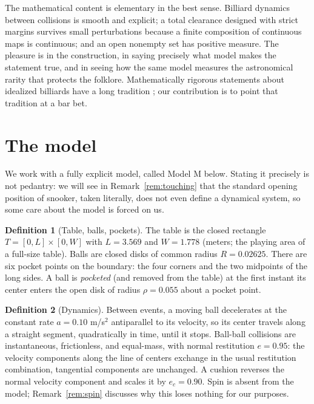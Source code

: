 \documentclass[11pt]{article}
\theoremstyle{definition}
\newtheorem{definition}{Definition}
\theoremstyle{remark}
\begin{document}
The mathematical content is elementary in the best sense. Billiard
dynamics between collisions is smooth and explicit; a total clearance
designed with strict margins survives small perturbations because a
finite composition of continuous maps is continuous; and an open
nonempty set has positive measure. The pleasure is in the
construction, in saying precisely what model makes the statement
true, and in seeing how the same model measures the astronomical
rarity that protects the folklore. Mathematically rigorous statements
about idealized billiards have a long tradition
\cite{sinai1970,tabachnikov2005}; our contribution is to point that
tradition at a bar bet.

\section{The model}
\label{sec:model}

We work with a fully explicit model, called Model M below. Stating it
precisely is not pedantry: we will see in
Remark~\ref{rem:touching} that the standard opening position of
snooker, taken literally, does not even define a dynamical system, so
some care about the model is forced on us.

\begin{definition}[Table, balls, pockets]
The table is the closed rectangle $T = [0, L] \times [0, W]$ with
$L = 3.569$ and $W = 1.778$ (meters; the playing area of a full-size
table). Balls are closed disks of common radius $R = 0.02625$. There
are six pocket points on the boundary: the four corners and the two
midpoints of the long sides. A ball is \emph{pocketed} (and removed
from the table) at the first instant its center enters the open disk
of radius $\rho = 0.055$ about a pocket point.
\end{definition}

\begin{definition}[Dynamics]
\label{def:dynamics}
Between events, a moving ball decelerates at the constant rate
$a = 0.10$ m/s$^2$ antiparallel to its velocity, so its center
travels along a straight segment, quadratically in time, until it
stops. Ball-ball collisions are instantaneous, frictionless, and
equal-mass, with normal restitution $e = 0.95$: the velocity
components along the line of centers exchange in the usual restitution
combination, tangential components are unchanged. A cushion reverses
the normal velocity component and scales it by $e_c = 0.90$. Spin is
absent from the model; Remark~\ref{rem:spin} discusses why this
loses nothing for our purposes.
\end{definition}
\end{document}
